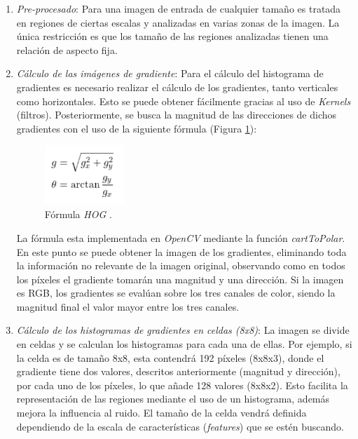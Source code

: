 \begin{enumerate}
	\item \textit{Pre-procesado}: Para una imagen de entrada de cualquier tamaño es tratada en regiones de ciertas escalas y analizadas en varias zonas de la imagen. La única restricción es que los tamaño de las regiones analizadas tienen una relación de aspecto fija.
	
	\item \textit{Cálculo de las imágenes de gradiente}: Para el cálculo del histograma de gradientes es necesario realizar el cálculo de los gradientes, tanto verticales como horizontales. Esto se puede obtener fácilmente gracias al uso de \textit{Kernels} (filtros). Posteriormente, se busca la magnitud de las direcciones de dichos gradientes con el uso de la siguiente fórmula (Figura \ref{fig:hogf}):
	
	\begin{figure}[htp]
		\centering
		\includegraphics[width=3cm]{imagenes/HOGFormula.png}
		\caption[Fórmula \textit{HOG}.]{Fórmula \textit{HOG} \cite{hog2}.}
		\label{fig:hogf}
	\end{figure}
	
	La fórmula esta implementada en \textit{OpenCV} mediante la función \textit{cartToPolar}. En este punto se puede obtener la imagen de los gradientes, eliminando toda la información no relevante de la imagen original, observando como en todos los píxeles el gradiente tomarán una magnitud y una dirección. Si la imagen es RGB, los gradientes se evalúan sobre los tres canales de color, siendo la magnitud final el valor mayor entre los tres canales.
	
	\item \textit{Cálculo de los histogramas de gradientes en celdas (8x8)}: La imagen se divide en celdas y se calculan los histogramas para cada una de ellas. Por ejemplo, si la celda es de tamaño 8x8, esta contendrá 192 píxeles (8x8x3), donde el gradiente tiene dos valores, descritos anteriormente (magnitud y dirección), por cada uno de los píxeles, lo que añade 128 valores (8x8x2). Esto facilita la representación de las regiones mediante el uso de un histograma, además mejora la influencia al ruido. El tamaño de la celda vendrá definida dependiendo de la escala de características (\textit{features}) que se estén buscando.
	

\end{enumerate}
